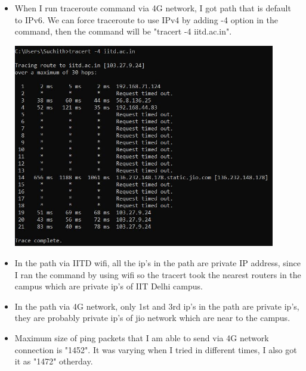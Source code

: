 \documentclass{article}
\begin{document}
\begin{itemize}
\item When I run traceroute command via 4G network, I got path that is default to IPv6. We can force traceroute to use IPv4 by adding -4 option in the command, then the command will be "tracert -4 iitd.ac.in".
\begin{center}
\centering
    \includegraphics[width=0.90\textwidth]{4G_ip4.jpg}
\end{center}
\item In the path via IITD wifi, all the ip's in the path are private IP address, since I ran the command by using wifi so the tracert took the nearest routers in the campus which are private ip's of IIT Delhi campus.
\item In the path via 4G network, only 1st and 3rd ip's in the path are private ip's, they are probably private ip's of jio network which are near to the campus.
\item Maximum size of ping packets that I am able to send via 4G network connection is "1452". It was varying when I tried in different times, I also got it as "1472" otherday.
\end{itemize}
\end{document}
